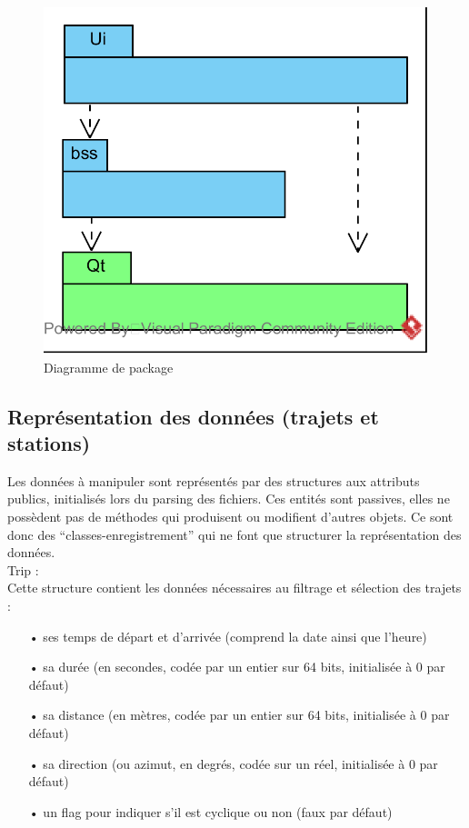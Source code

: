 \documentclass[12pt]{article}
\begin{document}
		\begin{figure}[!h]
		\begin{center}
		\includegraphics[scale=1]{dia_package.png}
		\caption{Diagramme de package}
		\end{center}
		\end{figure}
		
		\subsection{Représentation des données (trajets et stations)}
		Les données à manipuler sont représentés par des structures aux attributs publics,
		initialisés lors du parsing des fichiers. Ces entités sont passives, elles ne possèdent
		pas de méthodes qui produisent ou modifient d’autres objets. Ce sont donc des
		“classes-enregistrement” qui ne font que structurer la représentation des données.\\
		
		
		Trip :\\
		Cette structure contient les données nécessaires au filtrage et sélection des trajets :\\		
		\begin{itemize}
			\item[•]ses temps de départ et d’arrivée (comprend la date ainsi que l’heure)
			\item[•]sa durée (en secondes, codée par un entier sur 64 bits, initialisée à 0 par défaut)
			\item[•]sa distance (en mètres, codée par un entier sur 64 bits, initialisée à
			0 par défaut)
			\item[•]sa direction (ou azimut, en degrés, codée sur un réel, initialisée à 0 par défaut)
			\item[•]un flag pour indiquer s’il est cyclique ou non (faux par défaut)\\
		\end{itemize}
		
\end{document}
